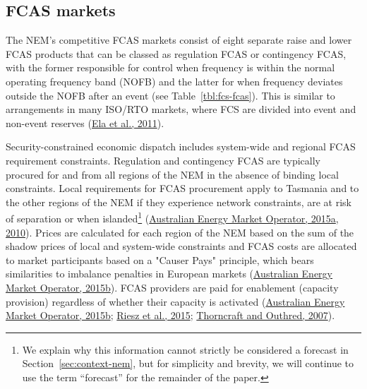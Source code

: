 \documentclass[12pt,a4paper,]{report}
\begin{document}
\hypertarget{fcas-markets}{%
\subsection{FCAS markets}\label{fcas-markets}}

The NEM's competitive FCAS markets consist of eight separate raise and
lower FCAS products that can be classed as regulation FCAS or
contingency FCAS, with the former responsible for control when frequency
is within the normal operating frequency band (NOFB) and the latter for
when frequency deviates outside the NOFB after an event (see
Table~\ref{tbl:fcs-fcas}). This is similar to arrangements in many
ISO/RTO markets, where FCS are divided into event and non-event reserves
(\protect\hyperlink{ref-elaOperatingReservesVariable2011}{Ela et al.,
2011}).

Security-constrained economic dispatch includes system-wide and regional
FCAS requirement constraints. Regulation and contingency FCAS are
typically procured for and from all regions of the NEM in the absence of
binding local constraints. Local requirements for FCAS procurement apply
to Tasmania and to the other regions of the NEM if they experience
network constraints, are at risk of separation or when
islanded\footnote{We explain why this information cannot strictly be
  considered a forecast in Section~\ref{sec:context-nem}, but for
  simplicity and brevity, we will continue to use the term ``forecast''
  for the remainder of the paper.}
(\protect\hyperlink{ref-australianenergymarketoperatorConstraintImplementationGuidelines2015}{Australian
Energy Market Operator, 2015a},
\protect\hyperlink{ref-australianenergymarketoperatorConstraintFormulationGuidelines2010}{2010}).
Prices are calculated for each region of the NEM based on the sum of the
shadow prices of local and system-wide constraints and FCAS costs are
allocated to market participants based on a "Causer Pays" principle,
which bears similarities to imbalance penalties in European markets
(\protect\hyperlink{ref-australianenergymarketoperatorGuideAncillaryServices2015}{Australian
Energy Market Operator, 2015b}). FCAS providers are paid for enablement
(capacity provision) regardless of whether their capacity is activated
(\protect\hyperlink{ref-australianenergymarketoperatorGuideAncillaryServices2015}{Australian
Energy Market Operator, 2015b};
\protect\hyperlink{ref-rieszFrequencyControlAncillary2015}{Riesz et al.,
2015};
\protect\hyperlink{ref-thorncraftExperienceMarketbasedAncillary2007}{Thorncraft
and Outhred, 2007}).
\end{document}
